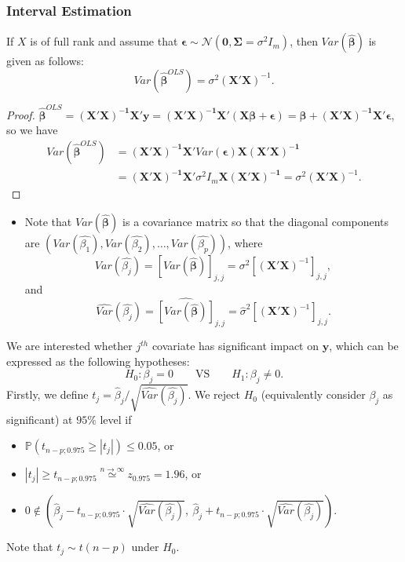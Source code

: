 \documentclass[ignorenonframetext,]{beamer}
\begin{document}
\begin{frame}[allowframebreaks]
\frametitle{Interval Estimation}

\begin{theorem}
If $X$ is of full rank and assume that $\bm{\epsilon} \sim \mathcal{N}(\bm{0, \Sigma}=\sigma^2 I_m)$, then $Var(\hat{\bm{\beta}})$ is given as follows:
$$
Var(\hat{\bm{\beta}}^{OLS})=\sigma^2 \bm{(X'X)}^{-1} .
$$
\end{theorem}

\begin{proof} 
$\hat{\bm{\beta}}^{OLS}=\bm{(X'X)^{-1} X'y} = \bm{(X'X)^{-1} X'(X\beta + \epsilon)} = \bm{\beta + (X'X)^{-1} X'\epsilon}$, so we have
$$
\begin{aligned}
Var(\hat{\bm{\beta}}^{OLS}) &= \bm{(X'X)^{-1}X'}  Var( \bm{ \epsilon}) \bm{X(X'X)^{-1} } \\
&= \bm{(X'X)^{-1}X'}   \sigma^2 I_m\bm{X(X'X)^{-1} } = \sigma^2 \bm{(X'X)}^{-1}.
\end{aligned}
$$

\end{proof}

\framebreak

\begin{itemize}
\item Note that $Var(\hat{\bm{\beta}})$ is a covariance matrix so that the diagonal components are $\left(Var(\hat{\beta_1}), Var(\hat{\beta_2}), \ldots, Var(\hat{\beta_p}) \right)$,
where
$$
Var(\hat{\beta_j}) = \left[Var(\hat{\bm{\beta}})\right]_{j,j} = \sigma^2 \left[\bm{(X'X)}^{-1}\right]_{j,j} ,
$$
and
$$
\widehat{Var}(\hat{\beta_j})  =\widehat{\left[Var(\hat{\bm{\beta}})\right]}_{j,j} =\hat{\sigma}^2 \left[\bm{(X'X)}^{-1}\right]_{j,j}.
$$

\end{itemize}

\framebreak
We are interested whether $j^{th}$ covariate has significant impact on $\mathbf{y}$, which can be expressed as the following hypotheses:
$$
H_0: \beta_j=0 \qquad \text{VS} \qquad H_1: \beta_j \ne 0.
$$
Firstly, we define $t_j = {\hat{\beta}_j}/{\sqrt{\widehat{Var}(\hat{\beta_j})}}$.
We reject $H_0$ (equivalently consider $\beta_j$ as significant) at $95\%$ level if 
\begin{itemize}
	\item $\mathbb{P} \left(t_{n-p;0.975}  \geq \left|t_j \right| \right) \leq 0.05$, or
	\item $\left|t_j\right| \geq t_{n-p;0.975} \overset{n \rightarrow \infty}\simeq z_{0.975} = 1.96$,  or
	\item $0 \not\in (\hat{\beta}_j - t_{n-p;0.975} \cdot \sqrt{\widehat{Var}(\hat{\beta_j})}, \ \hat{\beta}_j + t_{n-p;0.975}\cdot \sqrt{\widehat{Var}(\hat{\beta_j})}  )$.

\end{itemize}

Note that $t_j \sim t(n-p)$ under $H_0$.

\end{frame}
\end{document}
